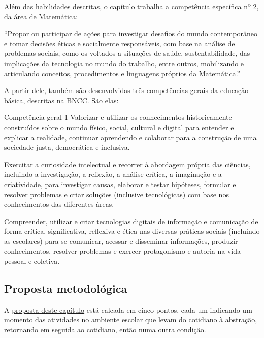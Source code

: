 \begin{apresentacao}
Além das habilidades descritas, o capítulo trabalha a competência específica nº 2, da área de Matemática:

“Propor ou participar de ações para investigar desafios do mundo contemporâneo e tomar decisões éticas e socialmente responsáveis, com base na análise de problemas sociais, como os voltados a situações de saúde, sustentabilidade, das implicações da tecnologia no mundo do trabalho, entre outros, mobilizando e articulando conceitos, procedimentos e linguagens próprios da Matemática.”

A partir dele, também são desenvolvidas três competências gerais da educação básica, descritas na BNCC. São elas:

\begin{habilities}{Competência geral 1}
Valorizar e utilizar os conhecimentos historicamente construídos sobre o mundo físico, social, cultural e digital para entender e explicar a realidade, continuar aprendendo e colaborar para a construção de uma sociedade justa, democrática e inclusiva. 

Exercitar a curiosidade intelectual e recorrer à abordagem própria das ciências, incluindo a investigação, a reflexão, a análise crítica, a imaginação e a criatividade, para investigar causas, elaborar e testar hipóteses, formular e resolver problemas e criar soluções (inclusive tecnológicas) com base nos conhecimentos das diferentes áreas.

Compreender, utilizar e criar tecnologias digitais de informação e comunicação de forma crítica, significativa, reflexiva e ética nas diversas práticas sociais (incluindo as escolares) para se comunicar, acessar e disseminar informações, produzir conhecimentos, resolver problemas e exercer protagonismo e autoria na vida pessoal e coletiva.
\end{habilities}

\subsection{Proposta metodológica}
A \hyperref[etapas-metodologicas]{proposta deste capítulo} está calcada em cinco pontos, cada um indicando um momento das atividades no ambiente escolar que levam do cotidiano à abstração, retornando em seguida ao cotidiano, então numa outra condição.



\end{apresentacao}
